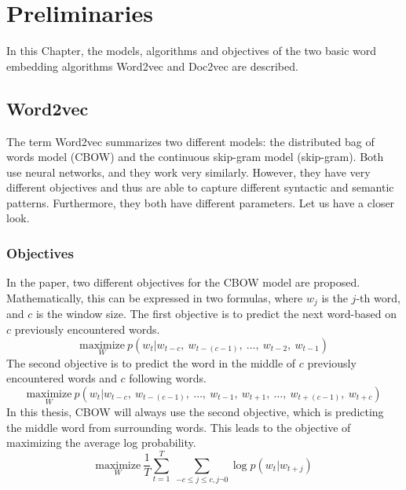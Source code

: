 \chapter{Preliminaries}\label{preliminaries}

In this Chapter, the models, algorithms and objectives of the two basic word embedding algorithms Word2vec and Doc2vec are described.

\section{Word2vec}

The term Word2vec summarizes two different models: the distributed bag of words model (CBOW) and the continuous skip-gram model (skip-gram). Both use neural networks, and they work very similarly. However, they have very different objectives and thus are able to capture different syntactic and semantic patterns. Furthermore, they both have different parameters. Let us have a closer look.

\subsection{Objectives}

In the paper, two different objectives for the CBOW model are proposed. Mathematically, this can be expressed in two formulas, where $w_{j}$ is the $j$-th word, and $c$ is the window size. The first objective is to predict the next word-based on $c$ previously encountered words.
\begin{displaymath}
  \underset{W}{\text{maximize}}\ p(w_{t} | w_{t - c},\ w_{t - (c-1)},\ \ldots,\ w_{t - 2},\ w_{t - 1})
\end{displaymath}
The second objective is to predict the word in the middle of $c$ previously encountered words and $c$ following words.
\begin{displaymath}
  \underset{W}{\text{maximize}}\ p(w_{t} | w_{t - c},\ w_{t - (c-1)},\ \ldots,\ w_{t - 1},\ w_{t + 1},\ \ldots,\ w_{t + (c-1)},\ w_{t + c})
\end{displaymath}
In this thesis, CBOW will always use the second objective, which is predicting the middle word from surrounding words. This leads to the objective of maximizing the average log probability.
\begin{displaymath}
 \underset{W}{\text{maximize}}\ \frac{1}{T} \sum_{t=1}^{T}\ \sum_{-c \leq j \leq c, j \neg 0} \log p(w_{t}|w_{t + j})
\end{displaymath}

